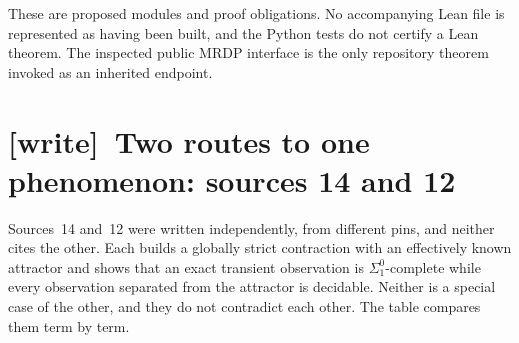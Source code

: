 \documentclass[11pt,letterpaper]{article}
\numberwithin{equation}{section}
\theoremstyle{definition}
\theoremstyle{remark}
\newcommand{\wtag}{\textup{[write]}}
\newcommand{\sigone}{\Sigma^0_1}
\begin{document}
These are proposed modules and proof obligations. No accompanying Lean
file is represented as having been built, and the Python tests do not
certify a Lean theorem. The inspected public MRDP interface is the only
repository theorem invoked as an inherited endpoint.


\section{\wtag\ Two routes to one phenomenon: sources 14 and 12}
\label{pqc:contr:sec:overlap}
Sources~14 and~12 were written independently, from different pins, and neither
cites the other. Each builds a globally strict contraction with an effectively
known attractor and shows that an exact transient observation is
$\sigone$-complete while every observation separated from the attractor is
decidable. Neither is a special case of the other, and they do not contradict
each other. The table compares them term by term.
\end{document}
